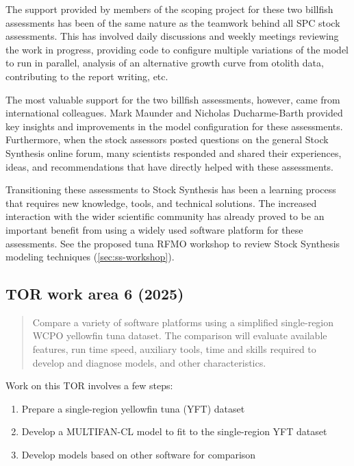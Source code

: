 \documentclass{SCreport}
\begin{document}
The support provided by members of the scoping project for these two billfish
assessments has been of the same nature as the teamwork behind all SPC stock
assessments. This has involved daily discussions and weekly meetings reviewing
the work in progress, providing code to configure multiple variations of the
model to run in parallel, analysis of an alternative growth curve from otolith
data, contributing to the report writing, etc.

The most valuable support for the two billfish assessments, however, came from
international colleagues. Mark Maunder and Nicholas Ducharme-Barth provided key
insights and improvements in the model configuration for these assessments.
Furthermore, when the stock assessors posted questions on the general Stock
Synthesis online forum, many scientists responded and shared their experiences,
ideas, and recommendations that have directly helped with these assessments.

Transitioning these assessments to Stock Synthesis has been a learning process
that requires new knowledge, tools, and technical solutions. The increased
interaction with the wider scientific community has already proved to be an
important benefit from using a widely used software platform for these
assessments. See the proposed tuna RFMO workshop to review Stock Synthesis
modeling techniques (\autoref{sec:ss-workshop}).

\vspace{2ex}

\subsection{TOR work area 6 (2025)}

\begin{quote}\sf
  Compare a variety of software platforms using a simplified single-region WCPO
  yellowfin tuna dataset. The comparison will evaluate available features, run
  time speed, auxiliary tools, time and skills required to develop and diagnose
  models, and other characteristics.
\end{quote}

\vspace{2ex}

Work on this TOR involves a few steps:

\begin{enumerate}
  \item Prepare a single-region yellowfin tuna (YFT) dataset\\[-4.5ex]
  \item Develop a MULTIFAN-CL model to fit to the single-region YFT
  dataset\\[-4.5ex]
  \item Develop models based on other software for comparison
\end{enumerate}
\end{document}
